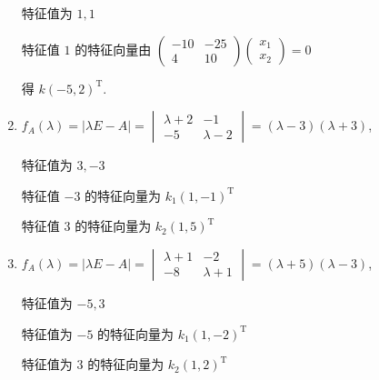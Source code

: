 \begin{enumerate}
			       特征值为 \( 1, 1 \)

			       特征值 \( 1 \) 的特征向量由 \( \begin{pmatrix}
				       -10 & -25 \\
				       4   & 10
			       \end{pmatrix}\begin{pmatrix}
				       x_{1} \\
				       x_{2}
			       \end{pmatrix} = 0 \)

			       得 \( k(-5, 2)^{\mathrm{T}} \).
			 \item %
			       \( f_{A}(\lambda) = |\lambda E - A| = \begin{vmatrix}
				       \lambda + 2 & -1          \\
				       -5          & \lambda - 2
			       \end{vmatrix} = (\lambda - 3)(\lambda + 3) \),

			       特征值为 \( 3, -3 \)

			       特征值 \( -3 \) 的特征向量为 \( k_1(1, -1)^{\mathrm{T}} \)

			       特征值 \( 3 \) 的特征向量为 \( k_2(1, 5)^{\mathrm{T}} \)
			 \item %
			       \( f_{A}(\lambda) = |\lambda E - A| = \begin{vmatrix}
				       \lambda + 1 & -2          \\
				       -8          & \lambda + 1
			       \end{vmatrix} = (\lambda + 5)(\lambda - 3) \),

			       特征值为 \( -5, 3 \)

			       特征值为 \( -5 \) 的特征向量为 \( k_1(1, -2)^{\mathrm{T}} \)

			       特征值为 \( 3 \) 的特征向量为 \( k_2(1, 2)^{\mathrm{T}} \)
		 \end{enumerate}

